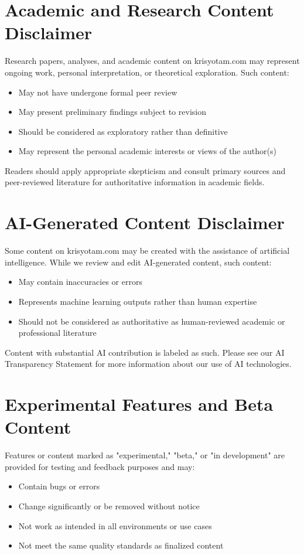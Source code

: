 \documentclass[11pt]{article}
\begin{document}
\section{Academic and Research Content Disclaimer}
Research papers, analyses, and academic content on krisyotam.com may represent ongoing work, personal interpretation, or theoretical exploration. Such content:
\begin{itemize}
  \item May not have undergone formal peer review
  \item May present preliminary findings subject to revision
  \item Should be considered as exploratory rather than definitive
  \item May represent the personal academic interests or views of the author(s)
\end{itemize}

Readers should apply appropriate skepticism and consult primary sources and peer-reviewed literature for authoritative information in academic fields.

\section{AI-Generated Content Disclaimer}
Some content on krisyotam.com may be created with the assistance of artificial intelligence. While we review and edit AI-generated content, such content:
\begin{itemize}
  \item May contain inaccuracies or errors
  \item Represents machine learning outputs rather than human expertise
  \item Should not be considered as authoritative as human-reviewed academic or professional literature
\end{itemize}

Content with substantial AI contribution is labeled as such. Please see our AI Transparency Statement for more information about our use of AI technologies.

\section{Experimental Features and Beta Content}
Features or content marked as "experimental," "beta," or "in development" are provided for testing and feedback purposes and may:
\begin{itemize}
  \item Contain bugs or errors
  \item Change significantly or be removed without notice
  \item Not work as intended in all environments or use cases
  \item Not meet the same quality standards as finalized content
\end{itemize}
\end{document}
